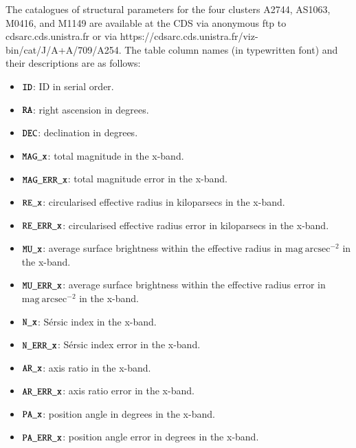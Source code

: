 \documentclass{aa}
\begin{document}
\begin{appendix}
The catalogues of structural parameters for the four clusters A2744, AS1063, M0416, and M1149 are available at the CDS via anonymous ftp to cdsarc.cds.unistra.fr or via https://cdsarc.cds.unistra.fr/viz-bin/cat/J/A+A/709/A254. The table column names (in typewritten font) and their descriptions are as follows:
\begin{itemize}
\item $\tt{ID}$: ID in serial order.
\item  $\tt{RA}$: right ascension in degrees.
\item  $\tt{DEC}$: declination in degrees.
\item  $\tt{MAG\_x}$: total magnitude in the x-band.
\item  $\tt{MAG\_ERR\_x}$: total magnitude error in the x-band.
\item  $\tt{RE\_x}$: circularised effective radius in kiloparsecs in the x-band.
\item  $\tt{RE\_ERR\_x}$: circularised effective radius error in kiloparsecs in the x-band.
\item  $\tt{MU\_x}$: average surface brightness within the effective radius in $\mathrm{mag\ arcsec^{-2}}$ in the x-band.
\item  $\tt{MU\_ERR\_x}$: average surface brightness within the effective radius error in $\mathrm{mag\ arcsec^{-2}}$ in the x-band.
\item  $\tt{N\_x}$: S\'ersic index in the x-band.
\item  $\tt{N\_ERR\_x}$: S\'ersic index error in the x-band.
\item  $\tt{AR\_x}$: axis ratio in the x-band.
\item  $\tt{AR\_ERR\_x}$: axis ratio error in the x-band.
\item  $\tt{PA\_x}$: position angle in degrees in the x-band.
\item  $\tt{PA\_ERR\_x}$: position angle error in degrees in the x-band.
\end{itemize}


\end{appendix}
\end{document}
